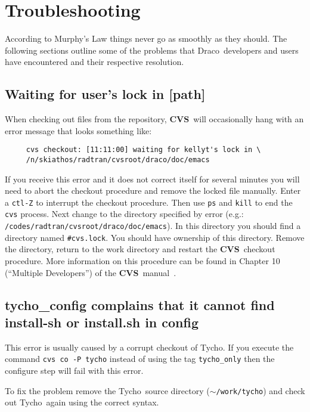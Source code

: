 \documentclass[11pt]{nmemo}
\newcommand{\comp}[1]{\normalfont\footnotesize\texttt{#1}\normalsize}
\newcommand{\draco}{{\normalfont\sffamily Draco}}
\newcommand{\tycho}{{\normalfont\sffamily Tycho}}
\newcommand{\cvs}{{\normalfont\bfseries CVS}}
\begin{document}
\section{Troubleshooting}

According to Murphy's Law things never go as smoothly as they should.
The following sections outline some of the problems that \draco\ 
developers and users have encountered and their respective resolution.

\subsection{Waiting for user's lock in [path]}

When checking out files from the repository, \cvs\ will occasionally
hang with an error message that looks something like:

\footnotesize
\begin{verbatim}
     cvs checkout: [11:11:00] waiting for kellyt's lock in \
     /n/skiathos/radtran/cvsroot/draco/doc/emacs
\end{verbatim}
\normalsize

If you receive this error and it does not correct itself for several
minutes you will need to abort the checkout procedure and remove the
locked file manually.  Enter a \comp{ctl-Z} to interrupt the checkout
procedure.  Then use \comp{ps} and \comp{kill} to end the \comp{cvs}
process.  Next change to the directory specified by error (e.g.:
\comp{/codes/radtran/cvsroot/draco/doc/emacs}).  In this
directory you should find a directory named \comp{\#cvs.lock}.  You
should have ownership of this directory.  Remove the directory, return
to the work directory and restart the \cvs\ checkout procedure.  More
information on this procedure can be found in Chapter 10 (``Multiple
Developers'') of the \cvs\ manual~\cite{cvs}.

\subsection{tycho\_config complains that it cannot find
  install-sh or install.sh in config}

This error is usually caused by a corrupt checkout of \tycho.  If you
execute the command \comp{cvs~co~-P~tycho} instead of using the tag
\comp{tycho\_only} then the configure step will fail with this error.  

To fix the problem remove the \tycho\ source directory
(\comp{$\sim$/work/tycho}) and check out \tycho\ again using the
correct syntax.
\end{document}
